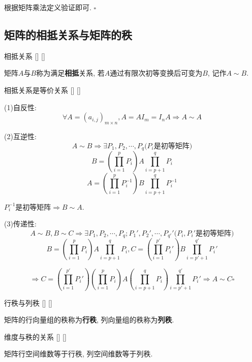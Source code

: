 \documentclass[UTF8]{ctexart}
\begin{document}
        \begin{prf}
			根据矩阵乘法定义验证即可. $\square$
	    \end{prf}
 
	\subsection{矩阵的相抵关系与矩阵的秩}
	
		\begin{dfn}
			[]
			{相抵关系}
			[]
			[]

			矩阵$A$与$B$称为满足\textbf{相抵}关系, 若$A$通过有限次初等变换后可变为$B$, 记作$A\sim B$. 
		\end{dfn}
		
		\begin{ppt}
			[]
			{相抵关系是等价关系}
			[]
			[]

		\end{ppt}
  
		\begin{prf}
			(1)自反性: 
				\[\forall A=(a_{i,j})_{m\times n}, A=AI_m=I_nA\Longrightarrow A\sim A\]
			
			(2)互逆性: 
				\[A\sim B\Longrightarrow\exists P_1,P_2,\cdots, P_q\text{($P_i$是初等矩阵)}\]
				\[B=(\prod_{i=1}^{p}P_i)A\prod_{i=p+1}^qP_{i}\]
				\[A=(\prod_{i=1}^{p}P_i^{-1})B\prod_{i=p+1}^qP_{i}^{-1}\]
				
				$P_i^{-1}$是初等矩阵$\Longrightarrow B\sim A$. 
				
			(3)传递性: 
				\[A\sim B, B\sim C\Longrightarrow\exists P_1,P_2,\cdots,P_q;P_1',P_2',\cdots,P_{q'}'\textbf{($P_i,P_i'$是初等矩阵)}\] 
				\[B=(\prod_{i=1}^{p}P_i)A\prod_{i=p+1}^qP_{i}, C=(\prod_{i=1}^{p'}P_i')B\prod_{i=p'+1}^{q'}P_i'\]
				
				\[\Longrightarrow C=(\prod_{i=1}^{p'}P_i')(\prod_{i=1}^{p}P_i)A(
                \prod_{i=p+1}^qP_{i})\prod_{i=p'+1}^{q'}P_i'\Longrightarrow A\sim C\square\]
		\end{prf}
  
		\begin{dfn}
			[]
			{行秩与列秩}
			[]
			[]

			矩阵的行向量组的秩称为\textbf{行秩}, 列向量组的秩称为\textbf{列秩}. 
		\end{dfn}
		
		\begin{ppt}
			[]
			{维度与秩的关系}
			[]
			[]

			矩阵行空间维数等于行秩, 列空间维数等于列秩. 
		\end{ppt}
  
\end{document}
